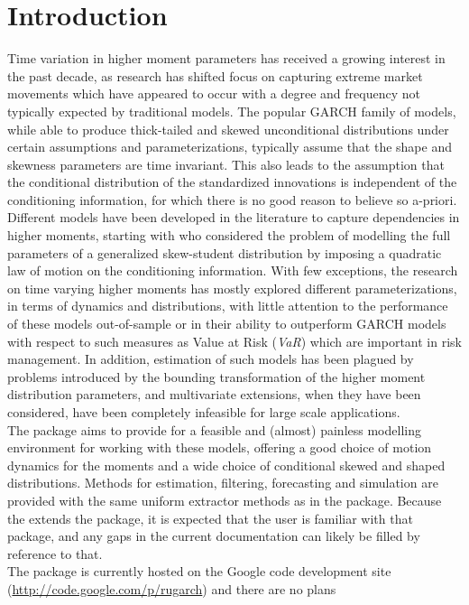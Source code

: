\section{Introduction}
Time variation in higher moment parameters has received a growing interest in the past decade, as research has shifted focus on capturing extreme market
movements which have appeared to occur with a degree and frequency not typically expected by traditional models. The popular GARCH family of models,
while able to produce thick-tailed and skewed unconditional distributions under certain assumptions and parameterizations, typically assume
that the shape and skewness parameters are time invariant. This also leads to the assumption that the conditional distribution of the standardized innovations
is independent of the conditioning information, for which there is no good reason to believe so a-priori. Different models have been developed in the literature to
capture dependencies in higher moments, starting with \citet{Hansen1994} who considered the problem of modelling the full parameters of a generalized
skew-student distribution by imposing a quadratic law of motion on the conditioning information. With few exceptions, the research on time varying
higher moments has mostly explored different parameterizations, in terms of dynamics and distributions, with little attention to the performance of these
models out-of-sample or in their ability to outperform GARCH models with respect to such measures as Value at Risk (\emph{VaR}) which are important in
risk management. In addition, estimation of such models has been plagued by problems introduced by the bounding transformation of the higher moment distribution
parameters, and multivariate extensions, when they have been considered, have been completely infeasible for large scale applications.\\
The \verb@racd@ package aims to provide for a feasible and (almost) painless modelling environment for working with these models, offering a good choice of
motion dynamics for the moments and a wide choice of conditional skewed and shaped distributions. Methods for estimation, filtering, forecasting and simulation are
provided with the same uniform extractor methods as in the \verb@rugarch@ package. Because the \verb@racd@ extends the \verb@rugarch@ package, it is expected
that the user is familiar with that package, and any gaps in the current documentation can likely be filled by reference to that.\\
The \verb@racd@ package is currently hosted on the \verb@rugarch@ Google code development site (\url{http://code.google.com/p/rugarch}) and there are no plans
